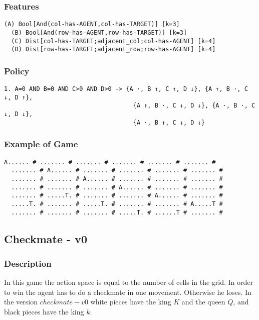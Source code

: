 \documentclass[a4paper]{article}
\begin{document}
\subsubsection{Features}
\begin{Verbatim}[fontsize=\footnotesize]
  (A) Bool[And(col-has-AGENT,col-has-TARGET)] [k=3]
  (B) Bool[And(row-has-AGENT,row-has-TARGET)] [k=3]
  (C) Dist[col-has-TARGET;adjacent_col;col-has-AGENT] [k=4]
  (D) Dist[row-has-TARGET;adjacent_row;row-has-AGENT] [k=4]

\end{Verbatim}

\subsubsection{Policy}
\begin{Verbatim}[fontsize=\footnotesize]
  1. A=0 AND B=0 AND C>0 AND D>0 -> {A ·, B ↑, C ↑, D ↓}, {A ↑, B ·, C ↓, D ↑},
                                    {A ↑, B ·, C ↓, D ↓}, {A ·, B ·, C ↓, D ↓},
                                    {A ·, B ↑, C ↓, D ↓}

\end{Verbatim}

\subsubsection{Example of Game}
\begin{Verbatim}[fontsize=\footnotesize]
  A...... # ....... # ....... # ....... # ....... # ....... #
  ....... # A...... # ....... # ....... # ....... # ....... #
  ....... # ....... # A...... # ....... # ....... # ....... #
  ....... # ....... # ....... # A...... # ....... # ....... #
  ....... # .....T. # ....... # ....... # A...... # ....... #
  .....T. # ....... # .....T. # ....... # ....... # A.....T #
  ....... # ....... # ....... # .....T. # ......T # ....... #
\end{Verbatim}

\subsection{Checkmate - v0}
\subsubsection{Description}
In this game the action space is equal to the number of cells in the grid. In order to win the agent has to do a checkmate in one movement. Otherwise he loses. In the version $checkmate-v0$ white pieces have the king $K$ and the queen $Q$, and black pieces have the king $k$.
\end{document}
